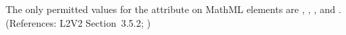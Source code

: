The only permitted values for the  attribute on MathML
 elements are , , , and
.  (References: L2V2 Section~3.5.2;
)
